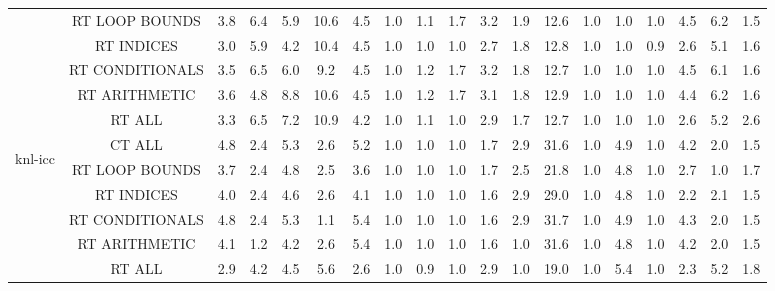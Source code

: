 \begin{adjustbox}{center}
\begin{tabular}{|c|c|c|c|c|c|c|c|c|c|c|c|c|c|c|c|c|c|c|}
 & RT LOOP BOUNDS & 3.8 & 6.4 & 5.9 & 10.6 & 4.5 & 1.0 & 1.1 & 1.7 & 3.2 & 1.9 & 12.6 & 1.0 & 1.0 & 1.0 & 4.5 & 6.2 & 1.5 \\ 
 & RT INDICES & 3.0 & 5.9 & 4.2 & 10.4 & 4.5 & 1.0 & 1.0 & 1.0 & 2.7 & 1.8 & 12.8 & 1.0 & 1.0 & 0.9 & 2.6 & 5.1 & 1.6 \\ 
 & RT CONDITIONALS & 3.5 & 6.5 & 6.0 & 9.2 & 4.5 & 1.0 & 1.2 & 1.7 & 3.2 & 1.8 & 12.7 & 1.0 & 1.0 & 1.0 & 4.5 & 6.1 & 1.6 \\ 
 & RT ARITHMETIC & 3.6 & 4.8 & 8.8 & 10.6 & 4.5 & 1.0 & 1.2 & 1.7 & 3.1 & 1.8 & 12.9 & 1.0 & 1.0 & 1.0 & 4.4 & 6.2 & 1.6 \\ 
 & RT ALL & 3.3 & 6.5 & 7.2 & 10.9 & 4.2 & 1.0 & 1.1 & 1.0 & 2.9 & 1.7 & 12.7 & 1.0 & 1.0 & 1.0 & 2.6 & 5.2 & 2.6 \\ 
\hline 
  \multirow{7}{*}{\begin{turn}{90}knl-icc\end{turn}} & CT ALL &4.8 & 2.4 & 5.3 & 2.6 & 5.2 & 1.0 & 1.0 & 1.0 & 1.7 & 2.9 & 31.6 & 1.0 & 4.9 & 1.0 & 4.2 & 2.0 & 1.5 \\ 
 & RT LOOP BOUNDS & 3.7 & 2.4 & 4.8 & 2.5 & 3.6 & 1.0 & 1.0 & 1.0 & 1.7 & 2.5 & 21.8 & 1.0 & 4.8 & 1.0 & 2.7 & 1.0 & 1.7 \\ 
 & RT INDICES & 4.0 & 2.4 & 4.6 & 2.6 & 4.1 & 1.0 & 1.0 & 1.0 & 1.6 & 2.9 & 29.0 & 1.0 & 4.8 & 1.0 & 2.2 & 2.1 & 1.5 \\ 
 & RT CONDITIONALS & 4.8 & 2.4 & 5.3 & 1.1 & 5.4 & 1.0 & 1.0 & 1.0 & 1.6 & 2.9 & 31.7 & 1.0 & 4.9 & 1.0 & 4.3 & 2.0 & 1.5 \\ 
 & RT ARITHMETIC & 4.1 & 1.2 & 4.2 & 2.6 & 5.4 & 1.0 & 1.0 & 1.0 & 1.6 & 1.0 & 31.6 & 1.0 & 4.8 & 1.0 & 4.2 & 2.0 & 1.5 \\ 
 & RT ALL & 2.9 & 4.2 & 4.5 & 5.6 & 2.6 & 1.0 & 0.9 & 1.0 & 2.9 & 1.0 & 19.0 & 1.0 & 5.4 & 1.0 & 2.3 & 5.2 & 1.8 \\ 
\hline 
\end{tabular}
\end{adjustbox}
